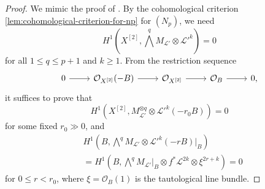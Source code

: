 \documentclass[a4paper]{amsart}
\numberwithin{equation}{section}
\theoremstyle{plain}
\theoremstyle{definition}
\theoremstyle{remark}
\numberwithin{figure}{section}
\numberwithin{table}{section}
\numberwithin{equation}{section}
\def \Lcal {\mathcal{L}}
\def \Ocal {\mathcal{O}}
\begin{document}
\begin{proof}

We mimic the proof of \cite[Theorem~1]{EL1993}.
By the cohomological criterion \ref{lem:cohomological-criterion-for-np} for $(N_p)$, we need
 \[
  H^1 \left( X^{[2]}, \bigwedge^q M_{\Lcal'} \otimes \Lcal'^k \right) = 0
 \]
for all $1 \leq q \leq p+1$ and $k \geq 1$.
From the restriction sequence
 \[
  \begin{tikzcd}
      0 \arrow{r} & \Ocal_{X^{[2]}}(-B) \arrow{r} & \Ocal_{X^{[2]}} \arrow{r} & \Ocal_B \arrow{r} & 0,
  \end{tikzcd}
 \]
it suffices to prove that
 \begin{equation} \label{eqn:vanishing-on-X2}
  H^1(X^{[2]},M_{\Lcal'}^{\otimes q} \otimes \Lcal'^{k}(-r_0B)) = 0
 \end{equation}
for some fixed $r_0 \gg 0$, and
 \begin{equation} \label{eqn:vanishing-on-B}
 \begin{split}
  &H^1 \left( B, \bigwedge^q M_{\Lcal'} \otimes \Lcal'^{k}(-rB)|_B \right) \\
    &= H^1 \left( B, \bigwedge^q M_{\Lcal'}|_B \otimes f^{\ast}\Lcal^{2k} \otimes \xi^{2r+k} \right)
    = 0
 \end{split}
 \end{equation}
for $0 \leq r < r_0$, where $\xi = \Ocal_B(1)$ is the tautological line bundle.


\end{proof}
\end{document}
